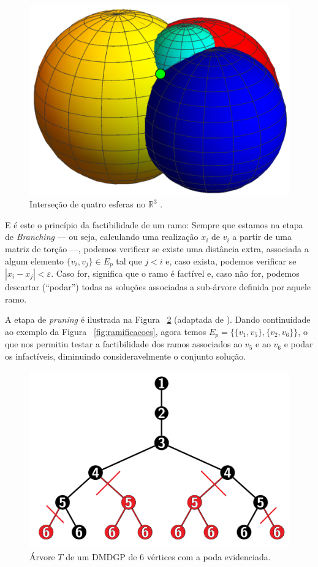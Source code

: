 \documentclass[a4paper,12pt]{article}
\begin{document}
	\begin{figure}[H]
		\begin{center}
			\includegraphics[width=0.35\linewidth]{quatroesferas.png}
		\end{center}
		\caption{Interseção de quatro esferas no $\mathbb{R}^3$ \cite{carlileBook31Coloquio}.}
		\label{fig:quatroesferas}
	\end{figure}
	
	E é este o princípio da factibilidade de um ramo: Sempre que estamos na etapa de \textit{Branching} --- ou seja, calculando uma realização $x_i$ de $v_i$ a partir de uma matriz de torção ---, podemos verificar se existe uma distância extra, associada a algum elemento $\{v_i,v_j\} \in E_p$ tal que $j < i$ e, caso exista, podemos verificar se $|x_i - x_j| < \varepsilon$. Caso for, significa que o ramo é factível e, caso não for, podemos descartar (``podar'') todas as soluções associadas a sub-árvore definida por aquele ramo.
	
	A etapa de \textit{pruning} é ilustrada na Figura ~\ref{fig:poda} (adaptada de \cite{fidalgotese}). Dando continuidade ao exemplo da Figura ~\ref{fig:ramificacoes}, agora temos $E_p = \{\{v_1,v_5\},\{v_2,v_6\}\}$, o que nos permitiu testar a factibilidade dos ramos associados ao $v_5$ e ao $v_6$ e podar os infactíveis, diminuindo consideravelmente o conjunto solução.
	
	\begin{figure}[H]
		\begin{center}
			\includegraphics[width=0.45\linewidth]{prune.png}
		\end{center}
		\caption{Árvore $T$ de um DMDGP de 6 vértices com a poda evidenciada.}
		\label{fig:poda}
	\end{figure}
\end{document}
